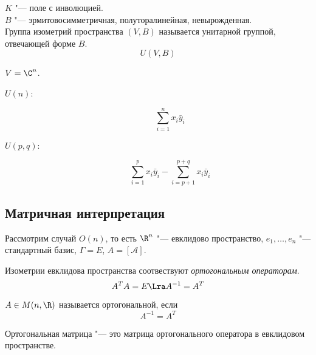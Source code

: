 \begin{Def}
	$K$ "--- поле с инволюцией. \\
	$B$ "--- эрмитовосимметричная, полуторалинейная, невырожденная.\\
	Группа изометрий пространства $(V, B)$ называется унитарной группой, отвечающей форме $B$.
	\[ U(V, B) \]
\end{Def}

\begin{exmp}
	$V = \C^n$.
	\begin{description}
	\item[$U(n)$:]
		\[ \sum_{i=1}^n x_i \bar y_i \]

	\item[$U(p, q)$:]
		\[ \sum_{i=1}^p x_i \bar y_i - \sum_{i=p+1}^{p+q} x_i \bar y_i \]
	\end{description}
\end{exmp}

\subsection{Матричная интерпретация}

Рассмотрим случай $O(n)$, то есть 
$\R^n$ "--- евклидово пространство, $e_1, \dots, e_n$ "--- стандартный базис, $\Gamma = E$, $A = [\mathcal A]$.

Изометрии евклидова пространства соотвествуют \textit{ортогональным операторам}.
\[ A^T A = E \Lra A^{-1} = A^T \]

\begin{Def}
	$A \in M(n, \R)$ называется ортогональной, если
	\[ A^{-1} = A^T \]
\end{Def}

Ортогональная матрица "--- это матрица ортогонального оператора в евклидовом пространстве.

